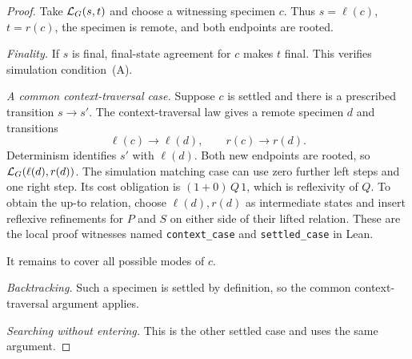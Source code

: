 \begin{proof}
Take $\mathcal L_G(s,t)$ and choose a witnessing specimen $c$. Thus
$s=\ell(c)$, $t=r(c)$, the specimen is remote, and both endpoints are
rooted.

\emph{Finality.} If $s$ is final, final-state agreement for $c$ makes
$t$ final. This verifies simulation condition~(A).

\emph{A common context-traversal case.} Suppose $c$ is settled and
there is a prescribed transition $s\to s'$. The context-traversal law
gives a remote specimen $d$ and transitions
\[
 \ell(c)\to\ell(d),\qquad r(c)\to r(d).
\]
Determinism identifies $s'$ with $\ell(d)$. Both new endpoints are
rooted, so $\mathcal L_G(\ell(d),r(d))$. The simulation matching case can use
zero further left steps and one right step. Its cost obligation is
$(1+0)\,Q\,1$, which is reflexivity of $Q$. To obtain the up-to
relation, choose $\ell(d),r(d)$ as intermediate states and insert
reflexive refinements for $P$ and $S$ on either side of their lifted
relation. These are the local proof witnesses named
\texttt{context\_case} and \texttt{settled\_case} in Lean.

It remains to cover all possible modes of $c$.

\emph{Backtracking.} Such a specimen is settled by definition, so the
common context-traversal argument applies.

\emph{Searching without entering.} This is the other settled case and
uses the same argument.


\end{proof}
